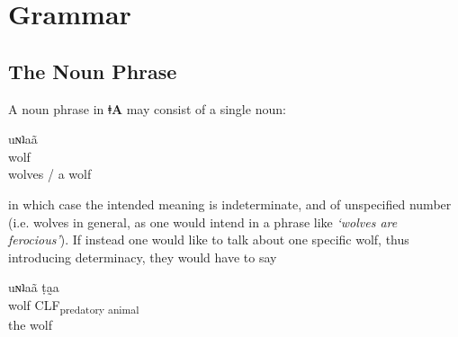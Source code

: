 \documentclass[11pt,a5paper]{book}
\newcommand{\qcn}[1]{\textcolor{AccentText}{\large\textbf{#1}}}
\newcommand{\langname}{\qcn{ǂA}}
\newcommand{\grammsc}[1]{\textsc{#1}}
\newcommand{\CLF}[1]{\grammsc{CLF}\textsubscript{#1}}
\begin{document}
%

\chapter{Grammar}

\section{The Noun Phrase}

A noun phrase in \langname{} may consist of a single noun:

\begin{exe}
\ex
\gll uɴʇaã\\
wolf\\
\glt wolves / a wolf
\end{exe}

in which case the intended meaning is indeterminate, and of unspecified number (i.e. wolves in general, as one would intend in a phrase like \emph{`wolves are ferocious'}). If instead one would like to talk about one specific wolf, thus introducing determinacy, they would have to say

\begin{exe}
\ex
\gll uɴʇaã ṭa̰a\\
wolf \CLF{predatory animal}\\
\glt the wolf
\end{exe}
\end{document}
